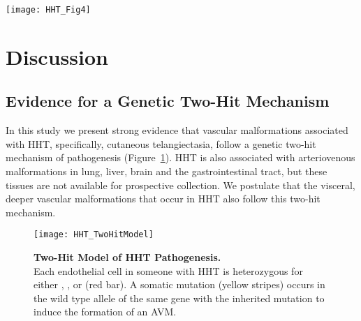 \begin{sidewaysfigure}[tbp!]
\begin{center}
\texttt{[image: HHT\_Fig4]}
\end{center}

\caption[Each Telangiectasia is Seeded by a Unique Somatic Mutation]{\textbf{Each Telangiectasia is Seeded by a Unique Somatic Mutation.} \\ Schematic representation of exons in  and  with germline and somatic mutations identified in (\textbf{A}) 5 telangiectasia collected from 6001 and (\textbf{B}) 2 telangiectasia collected from 6002. In each panel the common germline mutation is listed above the gene and somatic mutations in each telangiectasia below the gene. Gene structure and mutation position are drawn to scale. }

\label{HHT_Figure_4}
\end{sidewaysfigure}

\section{Discussion}
\subsection{Evidence for a Genetic Two-Hit Mechanism}
In this study we present strong evidence that vascular malformations associated with HHT, specifically, cutaneous telangiectasia, follow a genetic two-hit mechanism of pathogenesis (Figure~\ref{HHT_TwoHitModel}). HHT is also associated with arteriovenous malformations in lung, liver, brain and the gastrointestinal tract, but these tissues are not available for prospective collection.  We postulate that the visceral, deeper vascular malformations that occur in HHT also follow this two-hit mechanism.  

\begin{figure}[tbp!]
\begin{center}
\texttt{[image: HHT\_TwoHitModel]}
\end{center}

\caption[Two-Hit Model of HHT Pathogenesis]{\textbf{Two-Hit Model of HHT Pathogenesis.} \\  Each endothelial cell in someone with HHT is heterozygous for either , , or  (red bar). A somatic mutation (yellow stripes) occurs in the wild type allele of the same gene with the inherited mutation to induce the formation of an AVM.}

\label{HHT_TwoHitModel}
\end{figure}

